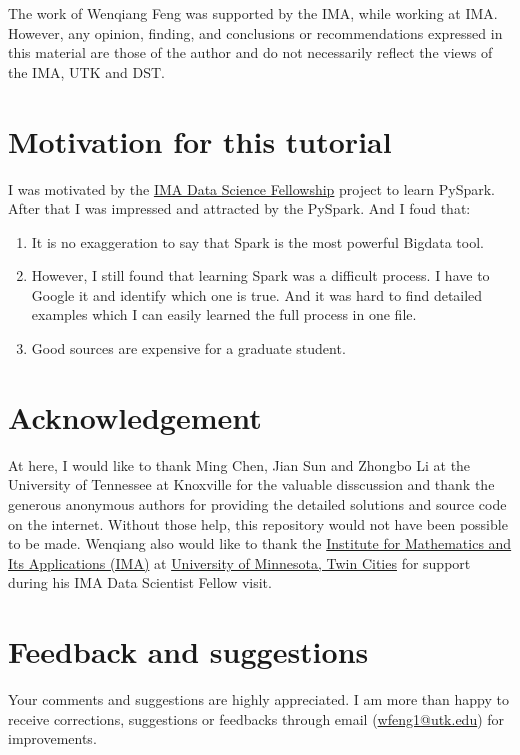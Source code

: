 \documentclass[letterpaper,11pt,english]{sphinxmanual}
\begin{document}
The work of Wenqiang Feng was supported by the IMA, while working at IMA. However, any opinion, finding, and conclusions or recommendations expressed in this material are those of the author and do not necessarily reflect the views of the IMA, UTK and DST.


\section{Motivation for this tutorial}
\label{preface:motivation-for-this-tutorial}
I was motivated by the \href{https://www.ima.umn.edu/2016-2017/SW1.23-3.10.17\#}{IMA Data Science Fellowship}
project to learn PySpark. After that I was impressed and attracted by the
PySpark. And I foud that:
\begin{enumerate}
\item {} 
It is no exaggeration to say that Spark is the most powerful
Bigdata tool.

\item {} 
However, I still found that learning Spark was a difficult
process. I have to Google it and identify which one is true.
And it was hard to find detailed examples which I can easily
learned the full process in one file.

\item {} 
Good sources are expensive for a graduate student.

\end{enumerate}


\section{Acknowledgement}
\label{preface:acknowledgement}
At here, I would like to thank Ming Chen, Jian Sun and Zhongbo Li at the
University of Tennessee at Knoxville for the valuable disscussion
and thank the generous anonymous authors for providing the detailed
solutions and source code on the internet. Without those help,
this repository would not have been possible to be made. Wenqiang
also would like to thank the \href{https://www.ima.umn.edu/}{Institute for Mathematics and Its
Applications (IMA)} at \href{https://twin-cities.umn.edu/}{University of Minnesota, Twin Cities}
for support during his IMA Data Scientist Fellow visit.


\section{Feedback and suggestions}
\label{preface:feedback-and-suggestions}
Your comments and suggestions are highly appreciated. I am more
than happy to receive corrections, suggestions or feedbacks through
email (\href{mailto:wfeng1@utk.edu}{wfeng1@utk.edu}) for improvements.
\end{document}
